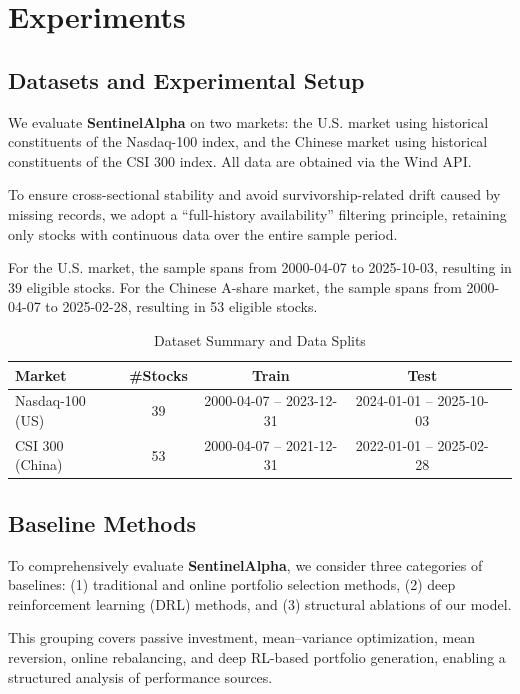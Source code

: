 \documentclass[letterpaper]{article} %
\begin{document}
\section{Experiments}
\subsection{Datasets and Experimental Setup}

We evaluate \textbf{SentinelAlpha} on two markets: the U.S. market using historical constituents of the Nasdaq-100 index, and the Chinese market using historical constituents of the CSI 300 index. All data are obtained via the Wind API. 

To ensure cross-sectional stability and avoid survivorship-related drift caused by missing records, we adopt a ``full-history availability'' filtering principle, retaining only stocks with continuous data over the entire sample period. 

For the U.S. market, the sample spans from 2000-04-07 to 2025-10-03, resulting in 39 eligible stocks.  
For the Chinese A-share market, the sample spans from 2000-04-07 to 2025-02-28, resulting in 53 eligible stocks.

\begin{table}[t]
\centering
\caption{Dataset Summary and Data Splits}
\label{tab:dataset}
\small
\begin{tabular}{lcccc}
\hline
\textbf{Market} 
& \textbf{\#Stocks} 
& \textbf{Train} 
& \textbf{Test} \\
\hline
Nasdaq-100 (US) 
& 39 
& 2000-04-07 -- 2023-12-31 
& 2024-01-01 -- 2025-10-03 \\
\hline
CSI 300 (China) 
& 53 
& 2000-04-07 -- 2021-12-31 
& 2022-01-01 -- 2025-02-28 \\
\hline
\end{tabular}
\end{table}


\subsection{Baseline Methods}

To comprehensively evaluate \textbf{SentinelAlpha}, we consider three categories of baselines: 
(1) traditional and online portfolio selection methods, 
(2) deep reinforcement learning (DRL) methods, and 
(3) structural ablations of our model. 

This grouping covers passive investment, mean--variance optimization, mean reversion, online rebalancing, and deep RL-based portfolio generation, enabling a structured analysis of performance sources.
\end{document}
